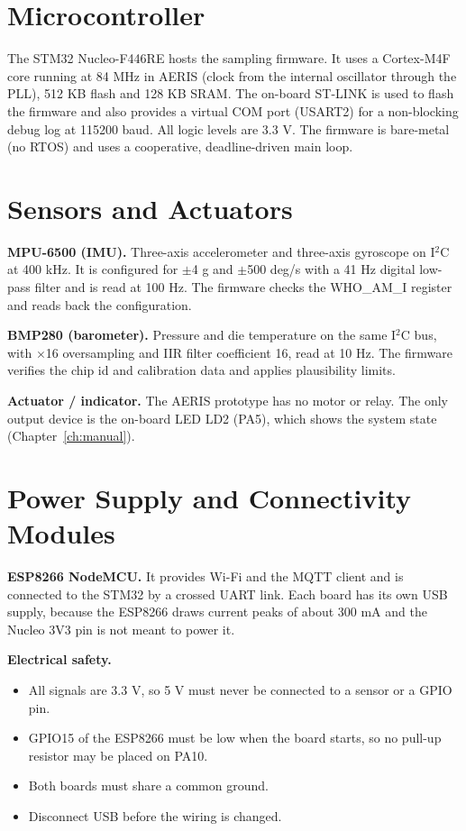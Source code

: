 \documentclass[12pt,a4paper]{report}
\begin{document}
\section{Microcontroller}
The STM32 Nucleo-F446RE hosts the sampling firmware. It uses a Cortex-M4F core running at 84 MHz in AERIS (clock from the internal oscillator through the PLL), 512 KB flash and 128 KB SRAM. The on-board ST-LINK is used to flash the firmware and also provides a virtual COM port (USART2) for a non-blocking debug log at 115200 baud. All logic levels are 3.3 V. The firmware is bare-metal (no RTOS) and uses a cooperative, deadline-driven main loop.

\section{Sensors and Actuators}
\textbf{MPU-6500 (IMU).} Three-axis accelerometer and three-axis gyroscope on I$^2$C at 400 kHz. It is configured for $\pm$4 g and $\pm$500 deg/s with a 41 Hz digital low-pass filter and is read at 100 Hz. The firmware checks the WHO\_AM\_I register and reads back the configuration.

\textbf{BMP280 (barometer).} Pressure and die temperature on the same I$^2$C bus, with $\times$16 oversampling and IIR filter coefficient 16, read at 10 Hz. The firmware verifies the chip id and calibration data and applies plausibility limits.

\textbf{Actuator / indicator.} The AERIS prototype has no motor or relay. The only output device is the on-board LED LD2 (PA5), which shows the system state (Chapter~\ref{ch:manual}).

\section{Power Supply and Connectivity Modules}
\textbf{ESP8266 NodeMCU.} It provides Wi-Fi and the MQTT client and is connected to the STM32 by a crossed UART link. Each board has its own USB supply, because the ESP8266 draws current peaks of about 300 mA and the Nucleo 3V3 pin is not meant to power it.

\textbf{Electrical safety.}
\begin{itemize}
\item All signals are 3.3 V, so 5 V must never be connected to a sensor or a GPIO pin.
\item GPIO15 of the ESP8266 must be low when the board starts, so no pull-up resistor may be placed on PA10.
\item Both boards must share a common ground.
\item Disconnect USB before the wiring is changed.
\end{itemize}
\end{document}
